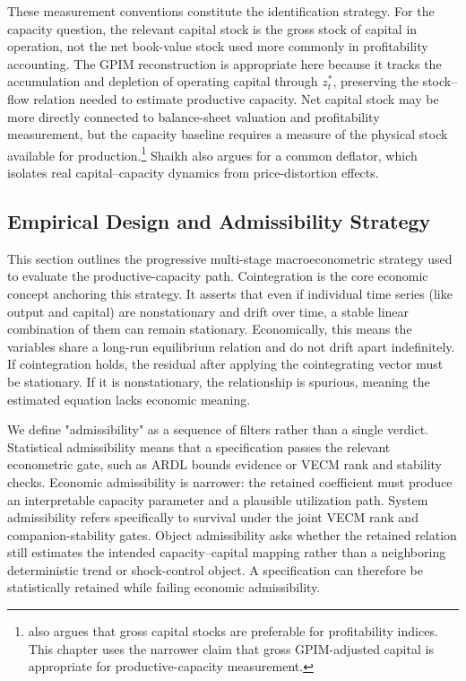 \documentclass[11pt]{article}
\begin{document}
These measurement conventions constitute the identification strategy. For the capacity question, the relevant capital stock is the gross stock of capital in operation, not the net book-value stock used more commonly in profitability accounting. The GPIM reconstruction is appropriate here because it tracks the accumulation and depletion of operating capital through $z_t^*$, preserving the stock--flow relation needed to estimate productive capacity. Net capital stock may be more directly connected to balance-sheet valuation and profitability measurement, but the capacity baseline requires a measure of the physical stock available for production.\footnote{\citet{Shaikh2016} also argues that gross capital stocks are preferable for profitability indices. This chapter uses the narrower claim that gross GPIM-adjusted capital is appropriate for productive-capacity measurement.} Shaikh also argues for a common deflator, which isolates real capital--capacity dynamics from price-distortion effects.

\subsection{Empirical Design and Admissibility Strategy}
\label{subsec:empirical_design}

This section outlines the progressive multi-stage macroeconometric strategy used to evaluate the productive-capacity path. Cointegration is the core economic concept anchoring this strategy. It asserts that even if individual time series (like output and capital) are nonstationary and drift over time, a stable linear combination of them can remain stationary. Economically, this means the variables share a long-run equilibrium relation and do not drift apart indefinitely. If cointegration holds, the residual after applying the cointegrating vector must be stationary. If it is nonstationary, the relationship is spurious, meaning the estimated equation lacks economic meaning.

We define "admissibility" as a sequence of filters rather than a single verdict. Statistical admissibility means that a specification passes the relevant econometric gate, such as ARDL bounds evidence or VECM rank and stability checks. Economic admissibility is narrower: the retained coefficient must produce an interpretable capacity parameter and a plausible utilization path. System admissibility refers specifically to survival under the joint VECM rank and companion-stability gates. Object admissibility asks whether the retained relation still estimates the intended capacity--capital mapping rather than a neighboring deterministic trend or shock-control object. A specification can therefore be statistically retained while failing economic admissibility.
\end{document}
